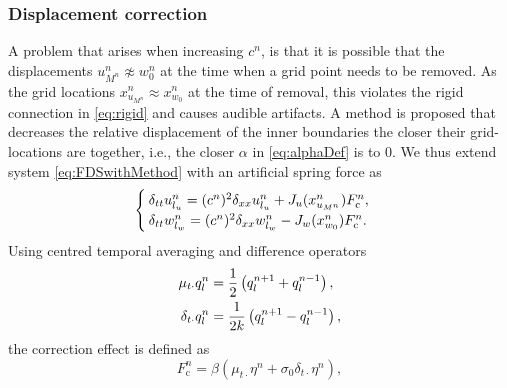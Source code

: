 \subsubsection{Displacement correction}\label{sec:dispCorr}
A problem that arises when increasing $c^n$, is that it is possible that the displacements $u_{M^n}^n \not\approx w_0^n$ at the time when a grid point needs to be removed. As the grid locations $x_{u_{M^n}}^n \approx x_{w_0}^n$ at the time of removal, this violates the rigid connection in \eqref{eq:rigid} and causes audible artifacts. A method is proposed that decreases the relative displacement of the inner boundaries the closer their grid-locations are together, i.e., the closer $\alpha$ in \eqref{eq:alphaDef} is to 0. We thus extend system \eqref{eq:FDSwithMethod} with an artificial spring force as
\begin{equation}\label{eq:sysDispCorr}
\begin{cases}
    \delta_{tt}u_\lu^n = (c^n)^2\delta_{xx}u_\lu^n+ J_u(x_{u_{M^n}}^n)%
    F_\text{c}^n,\\
    \delta_{tt}w_\lw^n = (c^n)^2\delta_{xx}w_\lw^n - J_w(x_{w_0}^n)%
    F_\text{c}^n.
\end{cases}
\end{equation}
Using centred temporal averaging and difference operators
\begin{subequations}\label{eq:centredOperators}
\begin{align}\label{eq:centredAverage}
    \mu_{t\cdot}q_l^n &= \frac{1}{2} \left(q_l^{n+1} + q_l^{n-1}\right),\\
    \delta_{t\cdot}q_l^n &= \frac{1}{2k} \left(q_l^{n+1} - q_l^{n-1}\right),
\end{align}
\end{subequations}
the correction effect %
is defined as %
\begin{equation}\label{eq:dispCorrForce}
    F_\text{c}^n = \beta \left(\mu_{t\cdot}\eta^n +\sigma_0\delta_{t\cdot}\eta^n \right),
\end{equation}
